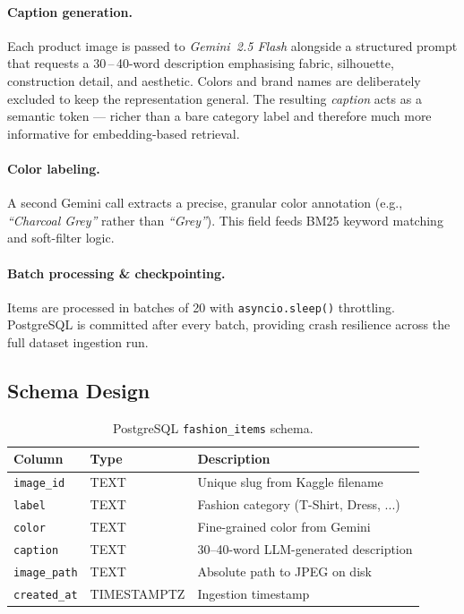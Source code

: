 \documentclass[12pt,a4paper]{article}
\begin{document}
\paragraph{Caption generation.}
Each product image is passed to \emph{Gemini~2.5 Flash} alongside a
structured prompt that requests a 30\,--\,40-word description
emphasising fabric, silhouette, construction detail, and aesthetic.
Colors and brand names are deliberately excluded to keep the
representation general.
The resulting \emph{caption} acts as a semantic token ---
richer than a bare category label and therefore much more
informative for embedding-based retrieval.

\paragraph{Color labeling.}
A second Gemini call extracts a precise, granular color annotation
(e.g., \textit{``Charcoal Grey''} rather than \textit{``Grey''}).
This field feeds BM25 keyword matching and soft-filter logic.

\paragraph{Batch processing \& checkpointing.}
Items are processed in batches of 20 with
\texttt{asyncio.sleep()} throttling.
PostgreSQL is committed after every batch, providing crash
resilience across the full dataset ingestion run.

\subsection{Schema Design}

\begin{table}[H]
\centering
\begin{tabularx}{\linewidth}{llX}
\toprule
\textbf{Column} & \textbf{Type} & \textbf{Description} \\
\midrule
\texttt{image\_id}  & TEXT   & Unique slug from Kaggle filename \\
\texttt{label}      & TEXT   & Fashion category (T-Shirt, Dress, ...) \\
\texttt{color}      & TEXT   & Fine-grained color from Gemini \\
\texttt{caption}    & TEXT   & 30–40-word LLM-generated description \\
\texttt{image\_path}& TEXT   & Absolute path to JPEG on disk \\
\texttt{created\_at}& TIMESTAMPTZ & Ingestion timestamp \\
\bottomrule
\end{tabularx}
\caption{PostgreSQL \texttt{fashion\_items} schema.}
\end{table}
\end{document}
